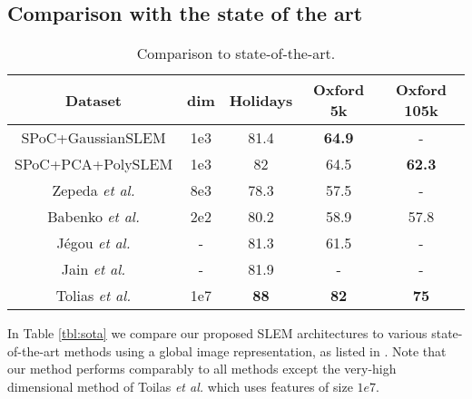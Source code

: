 \subsection{Comparison with the state of the art}
\label{sec:sota}
\begin{table}[!t]
  \centering
  \caption{Comparison to state-of-the-art.}
  \label{tbl:sota}
  \setlength{\tabcolsep}{.5em}
  \begin{tabular}{ccccc}
    \toprule
    Dataset & dim &\textbf{Holidays} & \textbf{Oxford 5k} & \textbf{Oxford 105k}\\
    \midrule
    SPoC+GaussianSLEM                           & 1e3  &  81.4           &  \textbf{64.9}  &   -  \\
    SPoC+PCA+PolySLEM                           & 1e3  &  82    &   64.5  &  \textbf{62.3} \\
    Zepeda \textit{et al.} \cite{ZePe15}        & 8e3 &   78.3   &  57.5&  - \\ 
    Babenko \textit{et al.} \cite{babenko15}     & 2e2  &  80.2           &   58.9  &  57.8 \\
    J\'egou \textit{et al.} \cite{sota1}         & -    &  81.3           &    61.5    &   -   \\
    Jain \textit{et al. } \cite{JaJeGro11}       &   -  &  81.9           &    -    &   -   \\
    \midrule
    Tolias \textit{et al.} \cite{Tolias13}      & 1e7  &  \textbf{88}     &  \textbf{82}    &  \textbf{75}   \\
    \bottomrule
  \end{tabular}
  \label{tab:sota}
\end{table}

In Table \ref{tbl:sota} we compare our proposed SLEM architectures to various state-of-the-art methods using a global image representation, as listed in \cite{holidaysSOTA}. 
Note that our method performs comparably to all methods except the very-high dimensional method of Toilas \textit{et al.} \cite{Tolias13} which uses features of size $1e7$.



